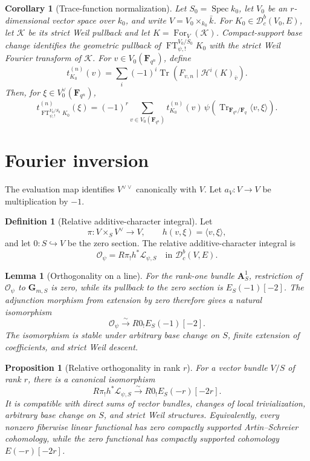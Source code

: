 \documentclass[10pt]{article}
\newtheorem{lemma}[theorem]{Lemma}
\newtheorem{proposition}[theorem]{Proposition}
\newtheorem{corollary}[theorem]{Corollary}
\theoremstyle{definition}
\newtheorem{definition}[theorem]{Definition}
\newcommand{\Fq}{\mathbf F_q}
\newcommand{\Aone}{\mathbf A^1}
\newcommand{\Dbc}{\mathcal D^b_c}
\newcommand{\FT}{\operatorname{FT}}
\newcommand{\Tr}{\operatorname{Tr}}
\newcommand{\Spec}{\operatorname{Spec}}
\begin{document}
\begin{corollary}[Trace-function normalization]
Let \(S_0=\Spec k_0\), let \(V_0\) be an \(r\)-dimensional vector space
over \(k_0\), and write \(V=V_0\times_{k_0}\bar k\).  For
\(K_0\in\Dbc(V_0,E)\), let \(\mathcal K\) be its strict Weil pullback and
let \(K=\operatorname{For}_V(\mathcal K)\).  Compact-support base change
identifies the geometric pullback of \(\FT^{V_0/S_0}_{\psi,!}K_0\) with
the strict Weil Fourier transform of \(\mathcal K\).  For
\(v\in V_0(\mathbf F_{q^n})\), define
\[
 t_{K_0}^{(n)}(v)=\sum_i(-1)^i
 \Tr\!\left(F_{v,n}\mid\mathcal H^i(K)_{\bar v}\right).
\]
Then, for \(\xi\in V_0^\vee(\mathbf F_{q^n})\),
\[
 t_{\FT^{V_0/S_0}_{\psi,!}K_0}^{(n)}(\xi)
 =(-1)^r\sum_{v\in V_0(\mathbf F_{q^n})}
 t_{K_0}^{(n)}(v)\,
 \psi\!\left(
 \Tr_{\mathbf F_{q^n}/\Fq}\langle v,\xi\rangle
 \right).
\]
\end{corollary}

\section{Fourier inversion}

The evaluation map identifies \(V^{\vee\vee}\) canonically with \(V\).  Let
\(a_V:V\to V\) be multiplication by \(-1\).

\begin{definition}[Relative additive-character integral]
Let
\[
 \pi:V\times_SV^\vee\longrightarrow V,
 \qquad h(v,\xi)=\langle v,\xi\rangle,
\]
and let \(0:S\hookrightarrow V\) be the zero section.  The relative
additive-character integral is
\[
 \mathcal O_\psi=R\pi_!h^*\mathcal L_{\psi,S}
 \quad\text{in }\Dbc(V,E).
\]
\end{definition}

\begin{lemma}[Orthogonality on a line]
For the rank-one bundle \(\Aone_S\), restriction of \(\mathcal O_\psi\)
to \(\mathbf G_{m,S}\) is zero, while its pullback to the zero section is
\(E_S(-1)[-2]\).  The adjunction morphism from extension by zero therefore
gives a natural isomorphism
\[
 \mathcal O_\psi\xrightarrow{\sim}R0_!E_S(-1)[-2].
\]
The isomorphism is stable under arbitrary base change on \(S\), finite
extension of coefficients, and strict Weil descent.
\end{lemma}

\begin{proposition}[Relative orthogonality in rank \(r\)]
For a vector bundle \(V/S\) of rank \(r\), there is a canonical
isomorphism
\[
 R\pi_!h^*\mathcal L_{\psi,S}
 \xrightarrow{\sim}R0_!E_S(-r)[-2r].
\]
It is compatible with direct sums of vector bundles, changes of local
trivialization, arbitrary base change on \(S\), and strict Weil structures.
Equivalently, every nonzero fiberwise linear functional has zero
compactly supported Artin--Schreier cohomology, while the zero functional
has compactly supported cohomology \(E(-r)[-2r]\).
\end{proposition}
\end{document}
